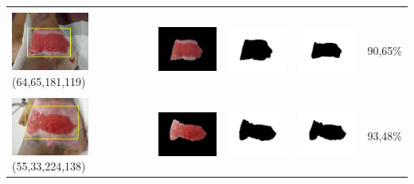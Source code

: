 \begin{table}[H]
\begin{tabular}{|m{1.0in}|m{1.0in}|m{1.0in}|m{1.0in}|m{0.6in}|}
		&  &  & \\
		\includegraphics[width=1.0in]{gambar/hasil_segmentasi/luka_merah/image_12_rect.jpg} {\centering\fontsize{10}{10}\selectfont(64,65,181,119)}&
		\includegraphics[width=1.0in]{gambar/hasil_segmentasi/luka_merah/result_12.jpg}&
		\includegraphics[width=1.0in]{gambar/hasil_segmentasi/luka_merah/mask_r_12.jpg}&
		\includegraphics[width=1.0in]{gambar/hasil_segmentasi/luka_merah/12_r.jpg}&
		90,65\% \\
		\hline

		&  &  & \\
		\includegraphics[width=1.0in]{gambar/hasil_segmentasi/luka_merah/image_14_rect.jpg} {\centering\fontsize{10}{10}\selectfont(55,33,224,138)}&
		\includegraphics[width=1.0in]{gambar/hasil_segmentasi/luka_merah/result_14.jpg}&
		\includegraphics[width=1.0in]{gambar/hasil_segmentasi/luka_merah/mask_r_14.jpg}&
		\includegraphics[width=1.0in]{gambar/hasil_segmentasi/luka_merah/14_r.jpg}&
		93,48\% \\
		\hline


\end{tabular}
\end{table}
